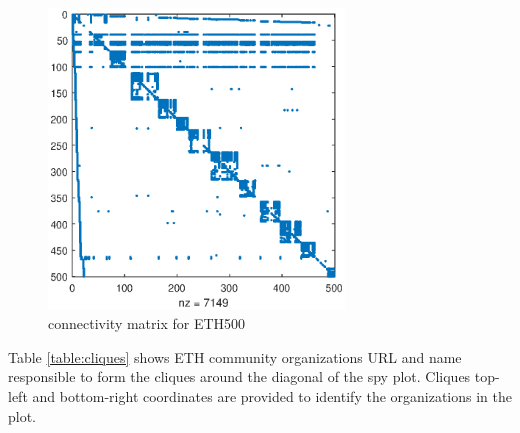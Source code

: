 \documentclass[unicode,11pt,a4paper,oneside,numbers=endperiod,openany]{scrartcl}
\begin{document}
\begin{figure}[h!]
    \centering
    \includegraphics[width=0.7\textwidth]{figures/cliques.eps}
    \caption{connectivity matrix for ETH500}
    \label{fig:cliques}
\end{figure}

Table \ref{table:cliques} shows ETH community organizations URL and name responsible to form the cliques around the diagonal of the spy plot.
Cliques top-left and bottom-right coordinates are provided to identify the organizations in the plot.
\end{document}
